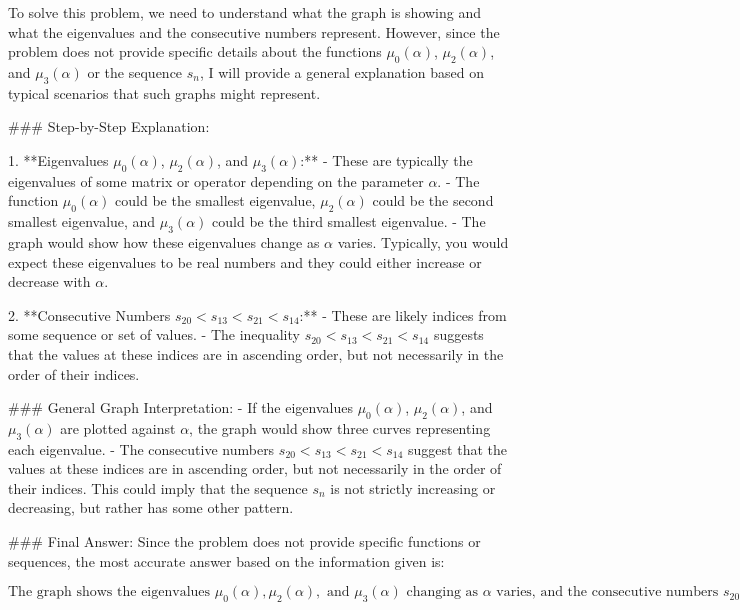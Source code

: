 To solve this problem, we need to understand what the graph is showing and what the eigenvalues and the consecutive numbers represent. However, since the problem does not provide specific details about the functions \(\mu_0(\alpha)\), \(\mu_2(\alpha)\), and \(\mu_3(\alpha)\) or the sequence \(s_n\), I will provide a general explanation based on typical scenarios that such graphs might represent.

### Step-by-Step Explanation:

1. **Eigenvalues \(\mu_0(\alpha)\), \(\mu_2(\alpha)\), and \(\mu_3(\alpha)\):**
   - These are typically the eigenvalues of some matrix or operator depending on the parameter \(\alpha\).
   - The function \(\mu_0(\alpha)\) could be the smallest eigenvalue, \(\mu_2(\alpha)\) could be the second smallest eigenvalue, and \(\mu_3(\alpha)\) could be the third smallest eigenvalue.
   - The graph would show how these eigenvalues change as \(\alpha\) varies. Typically, you would expect these eigenvalues to be real numbers and they could either increase or decrease with \(\alpha\).

2. **Consecutive Numbers \(s_{20} < s_{13} < s_{21} < s_{14}\):**
   - These are likely indices from some sequence or set of values.
   - The inequality \(s_{20} < s_{13} < s_{21} < s_{14}\) suggests that the values at these indices are in ascending order, but not necessarily in the order of their indices.

### General Graph Interpretation:
- If the eigenvalues \(\mu_0(\alpha)\), \(\mu_2(\alpha)\), and \(\mu_3(\alpha)\) are plotted against \(\alpha\), the graph would show three curves representing each eigenvalue.
- The consecutive numbers \(s_{20} < s_{13} < s_{21} < s_{14}\) suggest that the values at these indices are in ascending order, but not necessarily in the order of their indices. This could imply that the sequence \(s_n\) is not strictly increasing or decreasing, but rather has some other pattern.

### Final Answer:
Since the problem does not provide specific functions or sequences, the most accurate answer based on the information given is:

\[
\boxed{\text{The graph shows the eigenvalues } \mu_0(\alpha), \mu_2(\alpha), \text{ and } \mu_3(\alpha) \text{ changing as } \alpha \text{ varies, and the consecutive numbers } s_{20} < s_{13} < s_{21} < s_{14} \text{ are in ascending order but not necessarily in the order of their indices.}}
\]